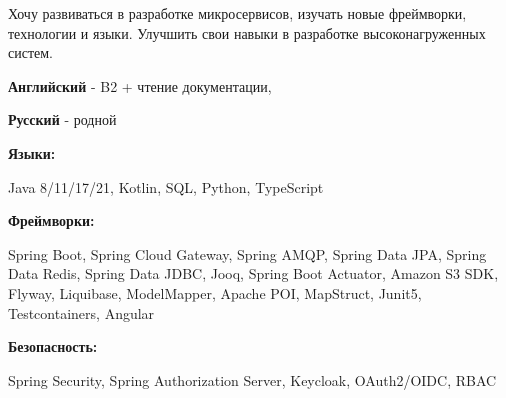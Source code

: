 \documentclass[9pt]{developercv} %
\begin{document}
\begin{minipage}[t]{0.46\textwidth}
	\vspace{-6pt}
    \begin{minipage}[t]{1\textwidth}
     Хочу развиваться в разработке микросервисов, изучать новые фреймворки, технологии и языки. Улучшить свои навыки в разработке высоконагруженных систем.
     \end{minipage}
\end{minipage}
\hfill %
\begin{minipage}[t]{0.465\textwidth}
    \vspace{-6pt}
    
    \textbf{Английский} - B2 + чтение документации, 
    
    \textbf{Русский} - родной
    
\end{minipage}


    \vspace{-6pt}

    \begin{minipage}[t]{0.2\textwidth}
        \textbf{Языки:}
    \end{minipage}
    \hfill
    \begin{minipage}[t]{0.73\textwidth}
      Java 8/11/17/21, Kotlin, SQL, Python, TypeScript
    \end{minipage}
    \vspace{2mm}

    \begin{minipage}[t]{0.2\textwidth}
        \textbf{Фреймворки:}
    \end{minipage}
    \hfill
    \begin{minipage}[t]{0.73\textwidth}
      Spring Boot, Spring Cloud Gateway, Spring AMQP, Spring Data JPA, Spring Data Redis, Spring Data JDBC, Jooq, Spring Boot Actuator, Amazon S3 SDK, Flyway, Liquibase, ModelMapper, Apache POI, MapStruct, Junit5, Testcontainers, Angular
    \end{minipage}
    \vspace{2mm}

    \begin{minipage}[t]{0.2\textwidth}
        \textbf{Безопасность:}
    \end{minipage}
    \hfill
    \begin{minipage}[t]{0.73\textwidth}
      Spring Security, Spring Authorization Server, Keycloak, OAuth2/OIDC, RBAC
    \end{minipage}
    \vspace{2mm}
\end{document}
